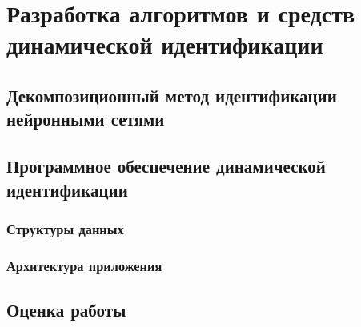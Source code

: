 \chapter{Разработка алгоритмов и средств динамической идентификации}

\section{Декомпозиционный метод идентификации нейронными сетями}

\section{Программное обеспечение динамической идентификации}

\subsection{Структуры данных}

\subsection{Архитектура приложения}

\section{Оценка работы}

